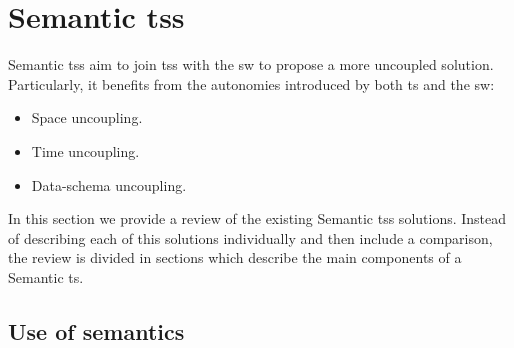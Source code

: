 \section{Semantic \aclp{ts}}
\label{sec:soa_tsc}


Semantic \aclp{ts} aim to join \aclp{ts} with the \acl{sw} to propose a more uncoupled solution.
Particularly, it benefits from the autonomies introduced by both \ac{ts} and the \ac{sw}:

\begin{itemize}
  \item Space uncoupling.
  \item Time uncoupling.
  \item Data-schema uncoupling. %
\end{itemize}


In this section we provide a review of the existing Semantic \aclp{ts} solutions. %
Instead of describing each of this solutions individually and then include a comparison,
the review is divided in sections which describe the main components of a Semantic \ac{ts}.




\subsection{Use of semantics}

